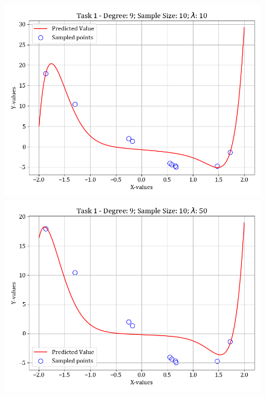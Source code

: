 \documentclass[12pt,a4paper]{article}
\begin{document}
\begin{figure}[H]
    \vspace{-2em}
    \hspace{-2em}
    \includegraphics[scale=0.45]{images/t1_d1/d_9_size_10_l_10.png}
    \includegraphics[scale=0.45]{images/t1_d1/d_9_size_10_l_50.png}
\end{figure}
\end{document}
